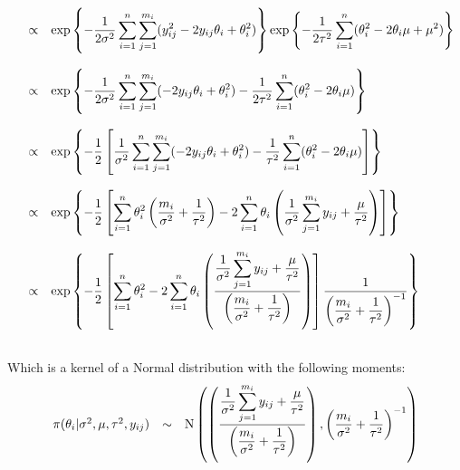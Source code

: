 \documentclass[a4paper, 11pt]{article}
\begin{document}
\begin{equation*}
\begin{array}{lcl ll }

& \propto & \mbox{exp}\left\{ - \dfrac{1}{2\sigma^2}\displaystyle\sum_{i=1}^{n}\displaystyle\sum_{j=1}^{m_i}(y_{ij}^2 - 2y_{ij}\theta_i + \theta_i^2)\right\} \mbox{exp}\left\{ - \dfrac{1}{2\tau^2} 
\displaystyle\sum_{i=1}^{n} (\theta_i^2 - 2\theta_i\mu +\mu^2)\right\}  \\ \\

& \propto & \mbox{exp}\left\{ - \dfrac{1}{2\sigma^2}\displaystyle\sum_{i=1}^{n}\displaystyle\sum_{j=1}^{m_i}(- 2y_{ij}\theta_i + \theta_i^2) - \dfrac{1}{2\tau^2} 
\displaystyle\sum_{i=1}^{n} (\theta_i^2 - 2\theta_i\mu)\right\} \\ \\

& \propto & \mbox{exp}\left\{ - \dfrac{1}{2} \left[ \dfrac{1}{\sigma^2}\displaystyle\sum_{i=1}^{n}\displaystyle\sum_{j=1}^{m_i}(- 2y_{ij}\theta_i + \theta_i^2) - \dfrac{1}{\tau^2} 
\displaystyle\sum_{i=1}^{n} (\theta_i^2 - 2\theta_i\mu)\right] \right\} \\ \\

& \propto & \mbox{exp}\left\{ - \dfrac{1}{2} \left[ \displaystyle\sum_{i=1}^{n} \theta_i^2  \left( \dfrac{m_i}{\sigma^2} + \dfrac{1}{\tau^2} \right) - 2 \displaystyle\sum_{i=1}^{n} \theta_i  \left( \dfrac{1}{\sigma^2}\displaystyle\sum_{j=1}^{m_i}y_{ij} + \dfrac{\mu}{\tau^2} \right)\right] \right\} \\ \\

& \propto & \mbox{exp}\left\{ - \dfrac{1}{2} \left[ \displaystyle\sum_{i=1}^{n} \theta_i^2 - 2 \displaystyle\sum_{i=1}^{n} \theta_i  \left( \dfrac{\dfrac{1}{\sigma^2}\displaystyle\sum_{j=1}^{m_i}y_{ij} + \dfrac{\mu}{\tau^2}}{ \left( \dfrac{m_i}{\sigma^2} + \dfrac{1}{\tau^2} \right)} \right)\right] \dfrac{1}{\left(\dfrac{m_i}{\sigma^2} + \dfrac{1}{\tau^2} \right)^{-1}} \right\} \\ \\

\end{array}
\end{equation*}

Which is a kernel of a Normal distribution with the following moments:\\
\begin{equation*}
\begin{array}{lcl ll }

\pi(\theta_i| \sigma^2, \mu, \tau^2, y_{ij}) & \sim &  \mbox{N} \left(  \left( \dfrac{\dfrac{1}{\sigma^2}\displaystyle\sum_{j=1}^{m_i}y_{ij} + \dfrac{\mu}{\tau^2}}{ \left( \dfrac{m_i}{\sigma^2} + \dfrac{1}{\tau^2} \right)} \right), \left(\dfrac{m_i}{\sigma^2} + \dfrac{1}{\tau^2} \right)^{-1} \right) \\\\

 \end{array}
\end{equation*}
\end{document}
